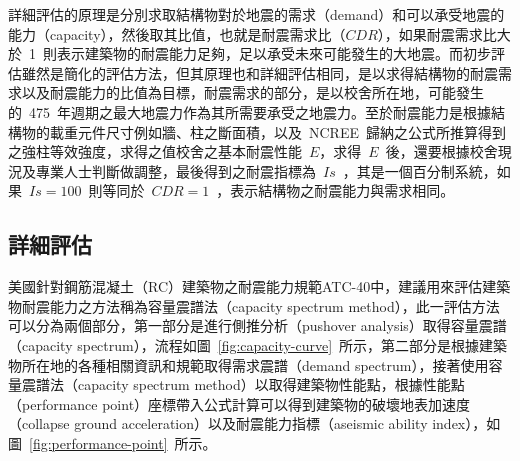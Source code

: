 詳細評估的原理是分別求取結構物對於地震的需求（demand）和可以承受地震的能力（capacity），然後取其比值，也就是耐震需求比（$CDR$），如果耐震需求比大於~1~則表示建築物的耐震能力足夠，足以承受未來可能發生的大地震。而初步評估雖然是簡化的評估方法，但其原理也和詳細評估相同，是以求得結構物的耐震需求以及耐震能力的比值為目標，耐震需求的部分，是以校舍所在地，可能發生的~475~年週期之最大地震力作為其所需要承受之地震力。至於耐震能力是根據結構物的載重元件尺寸例如牆、柱之斷面積，以及~NCREE~歸納之公式所推算得到之強柱等效強度，求得之值校舍之基本耐震性能~$E$，求得~$E$~後，還要根據校舍現況及專業人士判斷做調整，最後得到之耐震指標為~$Is$~，其是一個百分制系統，如果~$Is = 100$~則等同於~$CDR = 1$~，表示結構物之耐震能力與需求相同。




\subsection{詳細評估}

美國針對鋼筋混凝土（RC）建築物之耐震能力規範ATC-40\cite{applied1996seismic}中，建議用來評估建築物耐震能力之方法稱為容量震譜法（capacity spectrum method），此一評估方法可以分為兩個部分，第一部分是進行側推分析（pushover analysis）取得容量震譜（capacity spectrum），流程如圖~\ref{fig:capacity-curve}~所示，第二部分是根據建築物所在地的各種相關資訊和規範取得需求震譜（demand spectrum），接著使用容量震譜法（capacity spectrum method）以取得建築物性能點，根據性能點（performance point）座標帶入公式計算可以得到建築物的破壞地表加速度（collapse ground acceleration）以及耐震能力指標（aseismic ability index），如圖~\ref{fig:performance-point}~所示。

